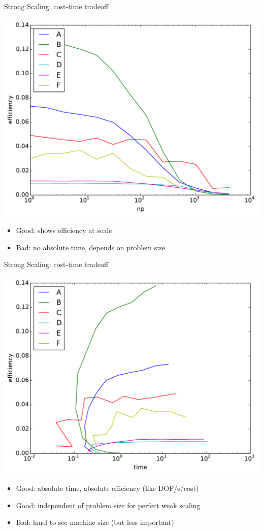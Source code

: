 \documentclass{beamer}
\begin{document}
\begin{frame}{Strong Scaling: cost-time tradeoff}
  \begin{center}
    \includegraphics[width=.75\textwidth]{figures/olenz/olenz-efficiency-np}
  \end{center}
  \begin{itemize}
  \item Good: shows efficiency at scale
  \item Bad: no absolute time, depends on problem size
  \end{itemize}
\end{frame}

\begin{frame}{Strong Scaling: cost-time tradeoff}
  \begin{center}
    \includegraphics[width=.75\textwidth]{figures/olenz/olenz-efficiency-time}
  \end{center}
  \begin{itemize}
  \item Good: absolute time, absolute efficiency (like DOF/s/cost)
  \item Good: independent of problem size for perfect weak scaling
  \item Bad: hard to see machine size (but less important)
  \end{itemize}
\end{frame}
\end{document}
